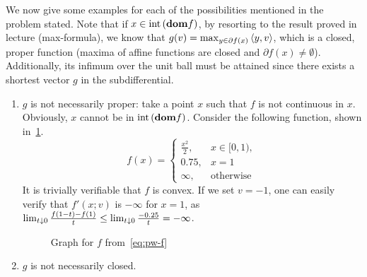 \documentclass[10pt]{article}
\begin{document}
\begin{Exercise}
    \ExePart

    We now give some examples for each of the possibilities mentioned in the
    problem stated. Note that if $x \in \mathrm{int}\left( \textbf{dom} f \right)$, by resorting to the
    result proved in lecture (max-formula), we know that $g(v) =
    \max_{y \in \partial f(x)} \left\langle y, v \right\rangle$, which is a closed, proper function
    (maxima of affine functions are closed and $\partial f(x)
    \neq \emptyset$). Additionally, its infimum over the unit ball must be
    attained since there exists a shortest vector $g$ in the subdifferential.
    \begin{enumerate}
    \item $g$ is not necessarily proper: take a point $x$ such that $f$ is not
    continuous in $x$. Obviously, $x$ cannot be in $\mathrm{int}\left( \textbf{dom} f \right)$. Consider
    the following function, shown in~\cref{fig:pw-f}.
    \begin{equation}
        f(x) = \begin{cases}
            \frac{x^2}{2}, & x \in [0, 1), \\
            0.75, & x = 1 \\
            \infty, & \text{otherwise}
        \end{cases}
        \label{eq:pw-f}
    \end{equation}
    It is trivially verifiable that $f$ is convex. If we set $v = -1$, one can
    easily verify that $f'(x; v)$ is $-\infty$ for $x = 1$, as $\lim_{t \downarrow 0}
    \frac{f(1 - t) - f(1)}{t} \leq \lim_{t \downarrow 0} \frac{-0.25}{t} = -\infty$.
    \begin{figure}[h]
        \centering
        \caption{Graph for $f$ from~\cref{eq:pw-f}}
        \label{fig:pw-f}
    \end{figure}
    \item $g$ is not necessarily closed.
    \end{enumerate}
\end{Exercise}
\end{document}
